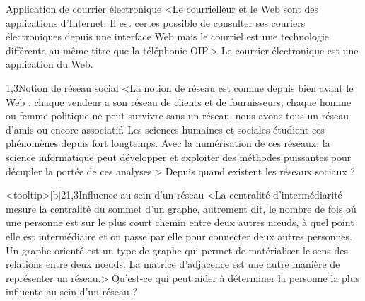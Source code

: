 \begin{quiz}[title={Web et usages}]
\begin{quizquestion*}[b]{2}{1}{Application de courrier électronique}
<Le courrielleur et le Web sont des applications d'Internet. Il est certes possible de consulter ses couriers électroniques depuis une interface Web mais le courriel est une technologie différente au même titre que la téléphonie OIP.>
Le courrier électronique est une application du Web.
\end{quizquestion*}

\begin{quizquestion*}[c]{2}{1,3}{Notion de réseau social}
<La notion de réseau est connue depuis bien avant le Web : chaque vendeur a son réseau de clients et de fournisseurs, chaque homme ou femme politique ne peut survivre sans un réseau, nous avons tous un réseau d'amis ou encore associatif. Les sciences humaines et sociales étudient ces phénomènes depuis fort longtemps. Avec la numérisation de ces réseaux, la science informatique peut développer et exploiter des méthodes puissantes pour décupler la portée de ces analyses.>
Depuis quand existent les réseaux sociaux ?
\end{quizquestion*}

\begin{quizquestion*}<tooltip>[b]{2}{1,3}{Influence au sein d'un réseau}
<La centralité d'intermédiarité mesure la centralité du sommet d'un graphe, autrement dit, le nombre de fois où une personne est sur le plus court chemin entre deux autres nœuds, à quel point elle est intermédiaire et on passe par elle pour connecter deux autres personnes.
Un graphe orienté est un type de graphe qui permet de matérialiser le sens des relations entre deux nœuds.
La matrice d'adjacence est une autre manière de représenter un réseau.>
Qu'est-ce qui peut aider à déterminer la personne la plus influente au sein d'un réseau ?
\end{quizquestion*}


\end{quiz}

